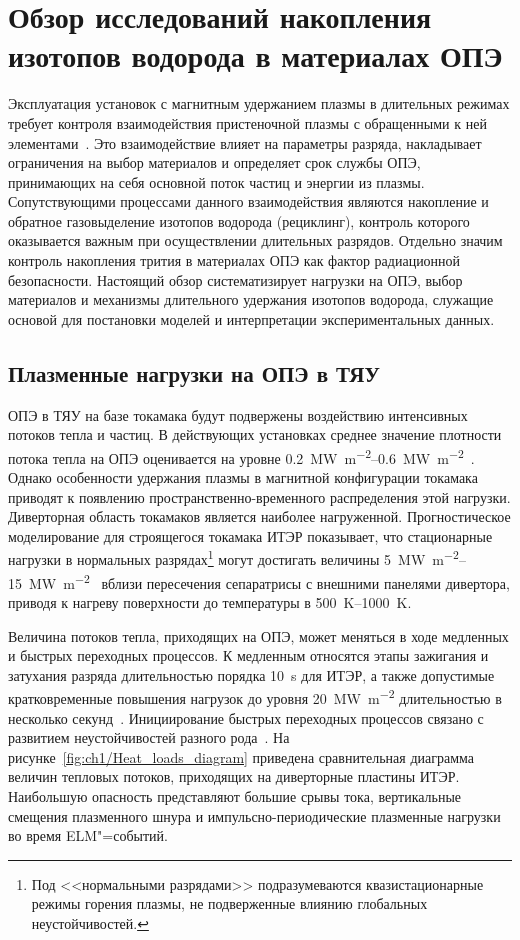 \chapter{Обзор исследований накопления изотопов водорода в материалах ОПЭ}\label{ch:ch1}

Эксплуатация установок с магнитным удержанием плазмы в длительных режимах требует контроля взаимодействия пристеночной плазмы с обращенными к ней элементами~\cite{Krieger2025}. Это взаимодействие влияет на параметры разряда, накладывает ограничения на выбор материалов и определяет срок службы ОПЭ, принимающих на себя основной поток частиц и энергии из плазмы. Сопутствующими процессами данного взаимодействия являются накопление и обратное газовыделение изотопов водорода (рециклинг), контроль которого оказывается важным при осуществлении длительных разрядов. Отдельно значим контроль накопления трития в материалах ОПЭ как фактор радиационной безопасности. Настоящий обзор систематизирует нагрузки на ОПЭ, выбор материалов и механизмы длительного удержания изотопов водорода, служащие основой для постановки моделей и интерпретации экспериментальных данных.

\section{Плазменные нагрузки на ОПЭ в ТЯУ}\label{sec:ch1/sec1}

ОПЭ в ТЯУ на базе токамака будут подвержены воздействию интенсивных потоков тепла и частиц. В действующих установках среднее значение плотности потока тепла на ОПЭ оценивается на уровне \SIrange{0.2}{0.6}{\mega\watt\per\metre\squared}~\cite{Mazul2021}. Однако особенности удержания плазмы в магнитной конфигурации токамака приводят к появлению пространственно-временного распределения этой нагрузки. Диверторная область токамаков является наиболее нагруженной. Прогностическое моделирование для строящегося токамака ИТЭР показывает, что стационарные нагрузки в нормальных разрядах\footnote{Под <<нормальными разрядами>> подразумеваются квазистационарные режимы горения плазмы, не подверженные влиянию глобальных неустойчивостей.} могут достигать величины \SIrange{5}{15}{\mega\watt\per\meter\squared}~\cite{Pitts2019,Orrico2023} вблизи пересечения сепаратрисы с внешними панелями дивертора, приводя к нагреву поверхности до температуры в \SIrange{500}{1000}{\kelvin}.

Величина потоков тепла, приходящих на ОПЭ, может меняться в ходе медленных и быстрых переходных процессов. К медленным относятся этапы зажигания и затухания разряда длительностью порядка \SI{10}{\second} для ИТЭР, а также допустимые кратковременные повышения нагрузок до уровня \SI{20}{\mega\watt\per\meter\squared} длительностью в несколько секунд~\cite{Pitts2017}. Инициирование быстрых переходных процессов связано с развитием неустойчивостей разного рода~\cite{hender2007mhd}. На рисунке~\cref{fig:ch1/Heat_loads_diagram} приведена сравнительная диаграмма величин тепловых потоков, приходящих на диверторные пластины ИТЭР. Наибольшую опасность представляют большие срывы тока, вертикальные смещения плазменного шнура и импульсно-периодические плазменные нагрузки во время ELM"=событий.

